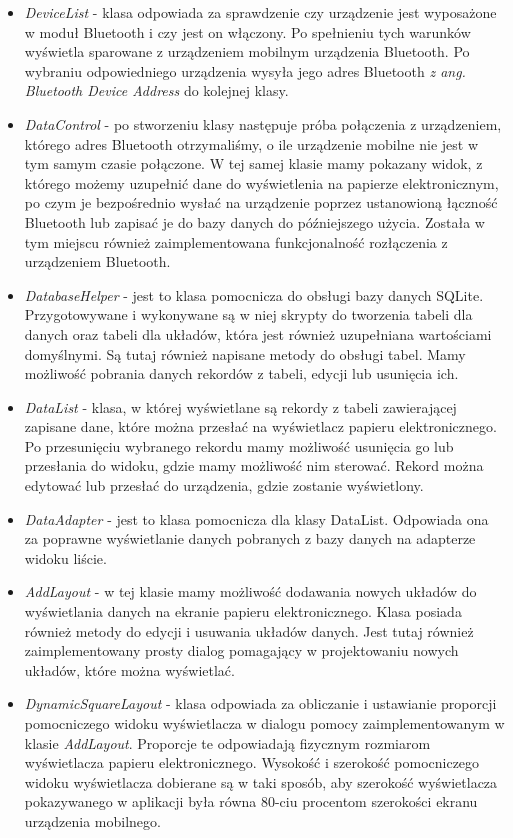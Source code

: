 \documentclass[a4paper,12pt, twoside]{article}
\begin{document}
	\begin{itemize}
	    \item \textit{DeviceList} - klasa odpowiada za sprawdzenie czy urządzenie jest wyposażone w moduł Bluetooth i czy jest on włączony. Po spełnieniu tych warunków wyświetla sparowane z urządzeniem mobilnym urządzenia Bluetooth. Po wybraniu odpowiedniego urządzenia wysyła jego adres Bluetooth \textit{z ang. Bluetooth Device Address}\cite{bdaddr} do kolejnej klasy.
	    \item \textit{DataControl} - po stworzeniu klasy następuje próba połączenia z urządzeniem, którego adres Bluetooth otrzymaliśmy, o ile urządzenie mobilne nie jest w tym samym czasie połączone. W tej samej klasie mamy pokazany widok, z którego możemy uzupełnić dane do wyświetlenia na papierze elektronicznym, po czym je bezpośrednio wysłać na urządzenie poprzez ustanowioną łączność Bluetooth lub zapisać je do bazy danych do późniejszego użycia. Została w tym miejscu również zaimplementowana funkcjonalność rozłączenia z urządzeniem Bluetooth.
	    \item \textit{DatabaseHelper} - jest to klasa pomocnicza do obsługi bazy danych SQLite. Przygotowywane i wykonywane są w niej skrypty do tworzenia tabeli dla danych oraz tabeli dla układów, która jest również uzupełniana wartościami domyślnymi. Są tutaj również napisane metody do obsługi tabel. Mamy możliwość pobrania danych rekordów z tabeli, edycji lub usunięcia ich.
	    \item \textit{DataList} - klasa, w której wyświetlane są rekordy z tabeli zawierającej zapisane dane, które można przesłać na wyświetlacz papieru elektronicznego. Po przesunięciu wybranego rekordu mamy możliwość usunięcia go lub przesłania do widoku, gdzie mamy możliwość nim sterować. Rekord można edytować lub przesłać do urządzenia, gdzie zostanie wyświetlony.
	    \item\textit{DataAdapter} - jest to klasa pomocnicza dla klasy DataList. Odpowiada ona za poprawne wyświetlanie danych pobranych z bazy danych na adapterze widoku liście.
	    \item \textit{AddLayout} - w tej klasie mamy możliwość dodawania nowych układów do wyświetlania danych na ekranie papieru elektronicznego. Klasa posiada również metody do edycji i usuwania układów danych. Jest tutaj również zaimplementowany prosty dialog pomagający w projektowaniu nowych układów, które można wyświetlać.
	    \item \textit{DynamicSquareLayout} - klasa odpowiada za obliczanie i ustawianie proporcji pomocniczego widoku wyświetlacza w dialogu pomocy zaimplementowanym w klasie \textit{AddLayout}. Proporcje te odpowiadają fizycznym rozmiarom wyświetlacza papieru elektronicznego. Wysokość i szerokość pomocniczego widoku wyświetlacza dobierane są w taki sposób, aby szerokość wyświetlacza pokazywanego w aplikacji była równa 80-ciu procentom szerokości ekranu urządzenia mobilnego.

\end{itemize}
\end{document}
